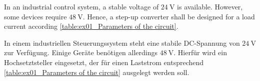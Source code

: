 


In an industrial control system, a stable voltage of $\SI{24}{\volt}$ is available.
However, some devices require $\SI{48}{\volt}$. Hence, a step-up converter shall be designed for a load current according \autoref{table:ex01_Parameters of the circuit}.

\begin{germanblock}
	In einem industriellen Steuerungssystem steht eine stabile DC-Spannung von $\SI{24}{\volt}$ zur Verfügung. Einige Geräte benötigen allerdings $\SI{48}{\volt}$. Hierfür wird ein Hochsetztsteller eingesetzt,
	der für einen Laststrom entsprechend \autoref{table:ex01_Parameters of the circuit} ausgelegt werden soll.
\end{germanblock}



